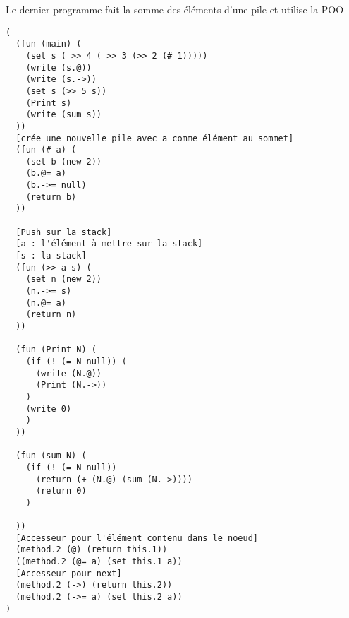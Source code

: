 Le dernier programme fait la somme des éléments d'une pile et utilise la POO
{\small
\begin{verbatim}
(
  (fun (main) (
    (set s ( >> 4 ( >> 3 (>> 2 (# 1)))))
    (write (s.@))
    (write (s.->))
    (set s (>> 5 s))
    (Print s)
    (write (sum s))
  ))
  [crée une nouvelle pile avec a comme élément au sommet]
  (fun (# a) (
    (set b (new 2))
    (b.@= a)
    (b.->= null)
    (return b)
  ))

  [Push sur la stack]
  [a : l'élément à mettre sur la stack]
  [s : la stack]
  (fun (>> a s) (
    (set n (new 2))
    (n.->= s)
    (n.@= a)
    (return n)
  )) 

  (fun (Print N) (
    (if (! (= N null)) (
      (write (N.@))
      (Print (N.->))
    )
    (write 0)
    )
  ))

  (fun (sum N) (
    (if (! (= N null)) 
      (return (+ (N.@) (sum (N.->))))
      (return 0)
    )
     
  ))
  [Accesseur pour l'élément contenu dans le noeud]
  (method.2 (@) (return this.1))
  ((method.2 (@= a) (set this.1 a))
  [Accesseur pour next]
  (method.2 (->) (return this.2))
  (method.2 (->= a) (set this.2 a))
)
\end{verbatim}}




 